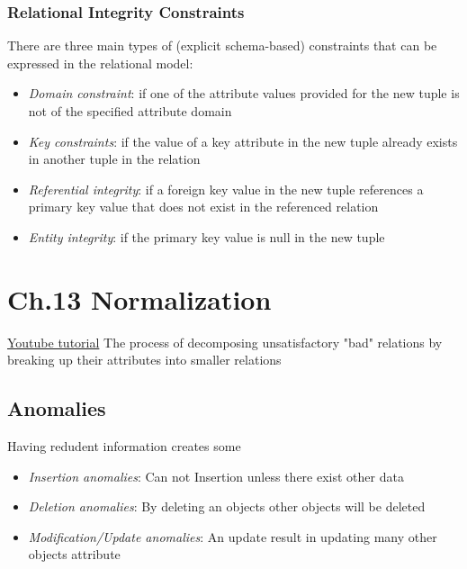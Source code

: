 \begin{multicols}{2}
\subsubsection{Relational Integrity Constraints}
There are three main types of (explicit schema-based) 
constraints that can be expressed in the relational model:
\begin{itemize}
    \item \textit{Domain constraint}: \newline if one of the attribute values provided for the new tuple is not of the specified attribute domain
    \item \textit{Key constraints}: \newline if the value of a key attribute in the new tuple already exists in another tuple in the relation
    \item \textit{Referential integrity}: \newline if a foreign key value in the new tuple references a primary key value that does not exist in the referenced relation
    \item \textit{Entity integrity}: \newline if the primary key value is null in the new tuple
\end{itemize}

\section{Ch.13 Normalization}
\href{https://www.youtube.com/watch?v=xoTyrdT9SZI}{Youtube tutorial}
The process of decomposing unsatisfactory "bad"
relations by breaking up their attributes into
smaller relations


\subsection{Anomalies}
Having redudent information creates some 
\begin{itemize}
    \item \textit{Insertion anomalies}: Can not Insertion unless there exist other data
    \item \textit{Deletion anomalies}: By deleting an objects other objects will be deleted 
    \item \textit{Modification/Update anomalies}: An update result in updating many other objects attribute
\end{itemize}


\end{multicols}
